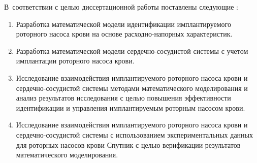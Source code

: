 В~соответствии с целью диссертационной работы поставлены следующие {\tasks}:
\begin{enumerate}
  \item Разработка математической модели идентификации имплантируемого роторного насоса крови на основе расходно-напорных характеристик.
  \item Разработка математической модели сердечно-сосудистой системы с учетом имплантации роторного насоса крови.
  \item Исследование взаимодействия имплантируемого роторного насоса крови и сердечно-сосудистой системы методами математического моделирования и анализ результатов исследования с целью повышения эффективности идентификации и управления имплантируемым роторным насосом крови.
  \item Исследование взаимодействия имплантируемого роторного насоса крови и сердечно-сосудистой системы с использованием экспериментальных данных для роторных насосов крови Спутник с целью верификации результатов математического моделирования.
\end{enumerate}

